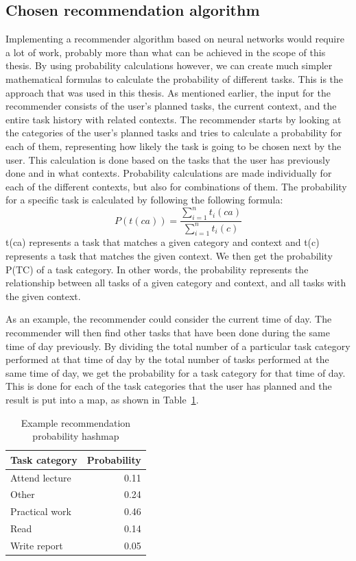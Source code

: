 \subsection{Chosen recommendation algorithm}
Implementing a recommender algorithm based on neural networks would require a lot of work, probably more than what can be achieved in the scope of this thesis. By using probability calculations however, we can create much simpler mathematical formulas to calculate the probability of different tasks. This is the approach that was used in this thesis. As mentioned earlier, the input for the recommender consists of the user's planned tasks, the current context, and the entire task history with related contexts. The recommender starts by looking at the categories of the user's planned tasks and tries to calculate a probability for each of them, representing how likely the task is going to be chosen next by the user. This calculation is done based on the tasks that the user has previously done and in what contexts. Probability calculations are made individually for each of the different contexts, but also for combinations of them. The probability for a specific task is calculated by following the following formula:
$$
  P(t(ca)) = \frac{\sum_{i=1}^{n}t_i(ca)}{\sum_{i=1}^{n}t_i(c)}
$$
t(ca) represents a task that matches a given category and context and t(c) represents a task that matches the given context. We then get the probability P(TC) of a task category. In other words, the probability represents the relationship between all tasks of a given category and context, and all tasks with the given context.

As an example, the recommender could consider the current time of day. The recommender will then find other tasks that have been done during the same time of day previously. By dividing the total number of a particular task category performed at that time of day by the total number of tasks performed at the same time of day, we get the probability for a task category for that time of day. This is done for each of the task categories that the user has planned and the result is put into a map, as shown in Table~\ref{tab:probabilitymaptimeofday}.
\begin{table}[tbp]
  \centering
  \begin{tabular}{|l|r|}
	\hline
	\textbf{Task category} & \textbf{Probability} \\
	\hline
	Attend lecture & 0.11 \\
  \hline
	Other & 0.24 \\
	\hline
	Practical work & 0.46 \\
	\hline
	Read & 0.14 \\
	\hline
	Write report & 0.05 \\
	\hline
  \end{tabular}
  \caption{Example recommendation probability hashmap}
  \label{tab:probabilitymaptimeofday}
\end{table}

